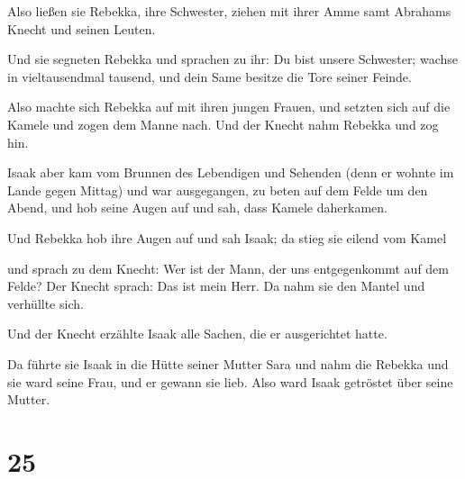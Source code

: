  Also ließen sie Rebekka, ihre Schwester, ziehen mit
ihrer Amme samt Abrahams Knecht und seinen Leuten.

 Und sie segneten Rebekka und sprachen zu ihr: Du bist
unsere Schwester; wachse in vieltausendmal tausend, und dein Same
besitze die Tore seiner Feinde.

 Also machte sich Rebekka auf mit ihren jungen Frauen,
und setzten sich auf die Kamele und zogen dem Manne nach. Und der Knecht
nahm Rebekka und zog hin.

 Isaak aber kam vom Brunnen des Lebendigen und Sehenden
(denn er wohnte im Lande gegen Mittag)  und war
ausgegangen, zu beten auf dem Felde um den Abend, und hob seine Augen
auf und sah, dass Kamele daherkamen.

 Und Rebekka hob ihre Augen auf und sah Isaak; da stieg
sie eilend vom Kamel

 und sprach zu dem Knecht: Wer ist der Mann, der uns
entgegenkommt auf dem Felde? Der Knecht sprach: Das ist mein Herr. Da
nahm sie den Mantel und verhüllte sich.

 Und der Knecht erzählte Isaak alle Sachen, die er
ausgerichtet hatte.

 Da führte sie Isaak in die Hütte seiner Mutter Sara und
nahm die Rebekka und sie ward seine Frau, und er gewann sie lieb. Also
ward Isaak getröstet über seine Mutter.

\hypertarget{section-24}{%
\section{25}\label{section-24}}

